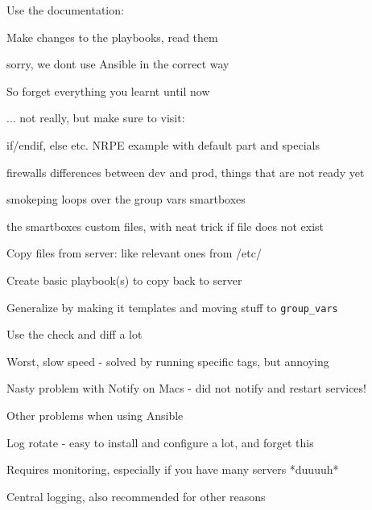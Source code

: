 \documentclass[18pt,landscape,a4paper,footrule]{foils}
\begin{document}
Use the documentation:\\




Make changes to the playbooks, read them


sorry, we dont use Ansible in the correct way

So forget everything you learnt until now \smiley

... not really, but make sure to visit:\\




if/endif, else etc. NRPE example with default part and specials

firewalls differences between dev and prod, things that are not ready yet

smokeping loops over the group vars smartboxes

the smartboxes custom files, with neat trick if file does not exist



\begin{list2}
\item Copy files from server: like relevant ones from /etc/
\item Create basic playbook(s) to copy back to server
\item Generalize by making it templates and moving stuff to \verb+group_vars+
\end{list2}

\centerline{Use the check and diff a lot \smiley}



\begin{list2}
\item Worst, slow speed - solved by running specific tags, but annoying
\item Nasty problem with Notify on Macs - did not notify and restart services!
\end{list2}


Other problems when using Ansible

\begin{list2}
\item Log rotate - easy to install and configure a lot, and forget this
\item Requires monitoring, especially if you have many servers *duuuuh*
\item Central logging, also recommended for other reasons
\end{list2}
\end{document}
